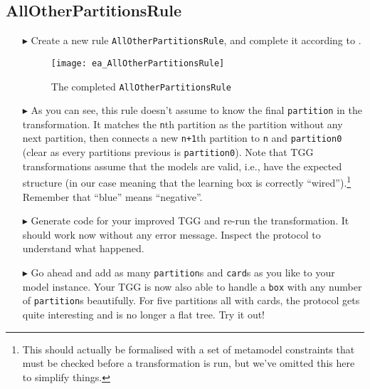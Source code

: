 \newpage
\hypertarget{allCards vis}{}
\subsection{AllOtherPartitionsRule}
\genHeader

\begin{itemize}

\item[$\blacktriangleright$] Create a new rule \texttt{AllOtherPartitionsRule}, and complete it according to .


\begin{figure}[htbp]
\begin{center}
  \texttt{[image: ea\_AllOtherPartitionsRule]}
  \caption{The completed \texttt{AllOtherPartitionsRule}}
  \label{fig:ea_AllOtherPartitionsRuleComplete}
\end{center}
\end{figure}

\item[$\blacktriangleright$] As you can see, this rule doesn't assume to know the final \texttt{partition} in the transformation. 
It matches the \texttt{n}th partition as the partition without any next partition, then connects a new \texttt{n+1}th partition to \texttt{n} and \texttt{partition0} (clear as every partitions previous is \texttt{partition0}).
Note that TGG transformations assume that the models are valid, i.e., have the expected structure (in our case meaning that the learning box is correctly ``wired'').\footnote{This should actually be formalised with a set of metamodel constraints that must be checked before a transformation is run, but we've omitted this here to simplify things.}  
Remember that ``blue'' means ``negative''.

\item[$\blacktriangleright$] Generate code for your improved TGG and re-run the transformation. 
It should work now without any error message.
Inspect the protocol to understand what happened.

\item[$\blacktriangleright$] Go ahead and add as many \texttt{partition}s and \texttt{card}s as you like to your model instance.
Your TGG is now also able to handle a \texttt{box} with any number of \texttt{partition}s beautifully.
For five partitions all with cards, the protocol gets quite interesting and is no longer a flat tree.
Try it out! 

\end{itemize}



